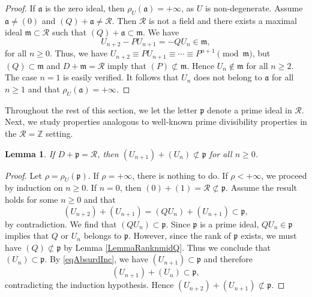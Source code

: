 \documentclass[reqno]{amsart}
\newtheorem{lemma}{Lemma}
\begin{document}
\begin{proof}
    If $\mathfrak{a}$ is the zero ideal, then $\rho_U(\mathfrak{a}) =+\infty$, as $U$ is non-degenerate. Assume $\mathfrak{a}\ne (0)$ and $(Q) + \mathfrak{a} \ne \mathscr{R}$. Then $\mathscr{R}$ is not a field and there exists a maximal ideal $\mathfrak{m}\subset \mathscr{R}$ such that $(Q)+\mathfrak{a} \subset \mathfrak{m}$. We have
    \[
    U_{n+2}-PU_{n+1} = -QU_n \in \mathfrak{m},
    \]
    for all $n\geq 0$. Thus, we have $U_{n+2} \equiv PU_{n+1} \equiv \cdots \equiv P^{n+1} \pmod{\mathfrak{m}}$, but $(Q) \subset \mathfrak{m}$ and $D+\mathfrak{m}=\mathscr{R}$ imply that $(P)\not \subset \mathfrak{m}$. Hence $U_n \not \in \mathfrak{m}$ for all $n\geq 2$. The case $n=1$ is easily verified. It follows that $U_n$ does not belong to $\mathfrak{a}$ for all $n\geq 1$ and that $\rho_U(\mathfrak{a})=+\infty$.
\end{proof}



Throughout the rest of this section, we let the letter $\mathfrak{p}$ denote a prime ideal in $\mathscr{R}$. Next, we study properties analogous to well-known prime divisibility properties in the $\mathscr{R}=\mathbb{Z}$ setting.

\begin{lemma}\label{LemmaUnUn+1ACCP}
    If $D+\mathfrak{p} = \mathscr{R}$, then $(U_{n+1})+(U_n)\not \subset \mathfrak{p}$ for all $n\geq 0$.
\end{lemma}

\begin{proof}
    Let $\rho=\rho_U(\mathfrak{p})$. If $\rho=+\infty$, there is nothing to do. If $\rho<+\infty$, we proceed by induction on $n\geq 0$. If $n=0$, then $(0)+(1)=\mathscr{R} \not \subset \mathfrak{p}$. Assume the result holds for some $n\geq 0$ and that
    \begin{equation}\label{eqAbsurdInc}
        (U_{n+2})+(U_{n+1}) = (QU_n) + (U_{n+1}) \subset \mathfrak{p},
    \end{equation}
    by contradiction. We find that $(QU_n)\subset \mathfrak{p}$. Since $\mathfrak{p}$ is a prime ideal, $QU_n\in \mathfrak{p}$ implies that $Q$ or $U_n$ belongs to $\mathfrak{p}$. However, since the rank of $\mathfrak{p}$ exists, we must have $(Q)\not \subset \mathfrak{p}$ by Lemma \ref{LemmaRanknmidQ}. Thus we conclude that $(U_n)\subset \mathfrak{p}$. By \eqref{eqAbsurdInc}, we have $(U_{n+1})\subset \mathfrak{p}$ and therefore
    \[
    (U_{n+1})+(U_n) \subset \mathfrak{p},
    \]
    contradicting the induction hypothesis. Hence $(U_{n+2})+(U_{n+1}) \not  \subset \mathfrak{p}$.
\end{proof}
\end{document}
